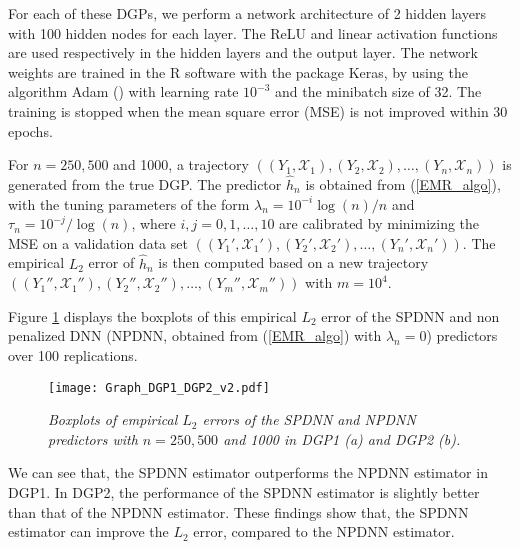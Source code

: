 \documentclass[10pt,twoside]{article}
\numberwithin{equation}{section}
\begin{document}
\medskip

For each of these DGPs, we perform a network architecture of 2 hidden layers with 100 hidden nodes for each layer. The ReLU and linear activation functions are used respectively in the hidden layers and the  output layer. 
%
The network weights are trained in the R software with the package Keras, by using the algorithm Adam (\cite{kingma2014adam}) with learning rate $10^{-3}$ and the minibatch size of 32.
%
The training is stopped when the mean square error (MSE) is not improved within 30 epochs.

\medskip

For $n=250, 500$ and 1000, a trajectory $ ((Y_1, \mathcal{X}_1), (Y_2, \mathcal{X}_2), \ldots, (Y_n, \mathcal{X}_n)) $ is generated from the true DGP.
%
The predictor $\widehat{h}_n$ is obtained from (\ref{EMR_algo}), with the tuning parameters of the form $\lambda_n = 10^{-i} \log(n)/n$ and $\tau_n = 10^{-j} / \log(n) $, where $i,j = 0, 1, \ldots, 10$ are calibrated by minimizing the MSE on a validation data set $ ((Y_1', \mathcal{X}_1'), (Y_2', \mathcal{X}_2'), \ldots, (Y_n', \mathcal{X}_n')) $.
%
The empirical $L_2$ error of $\widehat{h}_n$ is then computed based on a new trajectory $ ((Y_1'', \mathcal{X}_1''), (Y_2'', \mathcal{X}_2''), \ldots, (Y_m'', \mathcal{X}_m'')) $ with $m=10^4$.

\medskip

Figure \ref{Graphe_DGP_1_2} displays the boxplots of this empirical $L_2$ error of the SPDNN and non penalized DNN (NPDNN, obtained from (\ref{EMR_algo}) with $\lambda_n=0$) predictors over 100 replications.
%
\begin{figure}[h!]
\begin{center}
\texttt{[image: Graph\_DGP1\_DGP2\_v2.pdf]}
\end{center}
\vspace{-.7cm}
\caption{\it Boxplots of empirical $L_2$ errors of the SPDNN and NPDNN predictors with $n=250, 500$ and 1000 in DGP1 (a) and DGP2 (b).}
\label{Graphe_DGP_1_2}
\end{figure}
% 
We  can see that, the SPDNN estimator outperforms the NPDNN estimator in DGP1.
In DGP2, the performance of the SPDNN estimator is slightly better than that of the NPDNN estimator.
These findings show that, the SPDNN estimator can improve the $L_2$ error, compared to the NPDNN estimator.


\medskip
\end{document}
